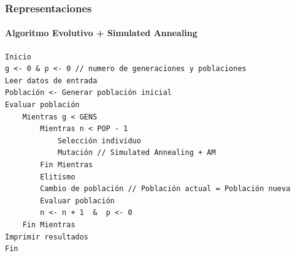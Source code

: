 \begin{frame}[fragile]
\frametitle{Representaciones}
\framesubtitle{Algoritmo Evolutivo + Simulated Annealing}
\tiny{
\begin{verbatim}
Inicio
g <- 0 & p <- 0 // numero de generaciones y poblaciones
Leer datos de entrada
Población <- Generar población inicial
Evaluar población
    Mientras g < GENS
        Mientras n < POP - 1
            Selección individuo
            Mutación // Simulated Annealing + AM
        Fin Mientras
        Elitismo
        Cambio de población // Población actual = Población nueva
        Evaluar población
        n <- n + 1  &  p <- 0
    Fin Mientras
Imprimir resultados
Fin
\end{verbatim}
}
\normalsize
\end{frame}

